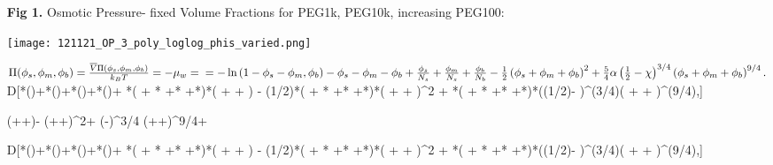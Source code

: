 \documentclass[12pt]{article}
\begin{document}

\begin{itemize}
\vspace{7 mm}
        \item[\bf{Fig 1.}] Osmotic Pressure- fixed Volume Fractions for PEG1k, PEG10k, increasing PEG100:\\
		\centerline{\texttt{[image: 121121\_OP\_3\_poly\_loglog\_phis\_varied.png]}}


$\Pi(\phi_s, \phi_m, \phi_b) = \frac{\overline V \Pi(\phi_s, \phi_m, \phi_b)}{k_B T} = - \mu_w = \\
= -  \ln{\left(1 - \phi_s - \phi_m, \phi_b\right)} - \phi_s - \phi_m - \phi_b + \frac{\phi_s}{N_s} + \frac{\phi_m}{N_s} + \frac{\phi_b}{N_b} \\ 
-{\textstyle\frac12}\left(\phi_s + \phi_m + \phi_b \right)^{2} + {\textstyle\frac{5}{4}} \alpha \left( {\textstyle\frac12} - \chi\right)^{3/4} \left( \phi_s + \phi_m + \phi_b\right)^{9/4}.$\\ 


D[*\log ()+*\log ()+*\log ()+*\log ()+ *( + * +* +*)*( +  + ) - (1/2)*( + * +* +*)*( +  + ){}^{\wedge}2 + *( + * +* +*)*((1/2)- ){}^{\wedge}(3/4)( +  + ){}^{\wedge}(9/4),]

 (++)- (++){}^2+ \left(-\right)^{3/4} (++){}^{9/4}+\log  {}

D[*\log ()+*\log ()+*\log ()+*\log ()+ *( + * +* +*)*( +  + ) - (1/2)*( + * +* +*)*( +  + ){}^{\wedge}2 + *( + * +* +*)*((1/2)- ){}^{\wedge}(3/4)( +  + ){}^{\wedge}(9/4),]


\end{itemize}
\end{document}
